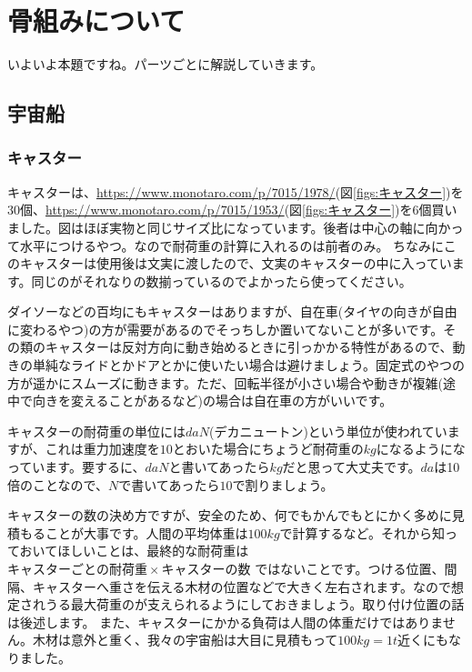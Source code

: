 \documentclass[uplatex,dvipdfmx]{jsarticle}
\begin{document}
\section{骨組みについて}

いよいよ本題ですね。パーツごとに解説していきます。

\subsection{宇宙船}
\subsubsection{キャスター}

キャスターは、\url{https://www.monotaro.com/p/7015/1978/}(図\ref{figs:キャスター})を30個、\url{https://www.monotaro.com/p/7015/1953/}(図\ref{figs:キャスター})を6個買いました。図はほぼ実物と同じサイズ比になっています。後者は中心の軸に向かって水平につけるやつ。なので耐荷重の計算に入れるのは前者のみ。
ちなみにこのキャスターは使用後は文実に渡したので、文実のキャスターの中に入っています。同じのがそれなりの数揃っているのでよかったら使ってください。

ダイソーなどの百均にもキャスターはありますが、自在車(タイヤの向きが自由に変わるやつ)の方が需要があるのでそっちしか置いてないことが多いです。その類のキャスターは反対方向に動き始めるときに引っかかる特性があるので、動きの単純なライドとかドアとかに使いたい場合は避けましょう。固定式のやつの方が遥かにスムーズに動きます。ただ、回転半径が小さい場合や動きが複雑(途中で向きを変えることがあるなど)の場合は自在車の方がいいです。

キャスターの耐荷重の単位には$\si{daN}$(デカニュートン)という単位が使われていますが、これは重力加速度を$10$とおいた場合にちょうど耐荷重の$\si{kg}$になるようになっています。要するに、$\si{daN}$と書いてあったら$\si{kg}$だと思って大丈夫です。$\si{da}$は10倍のことなので、$\si{N}$で書いてあったら$10$で割りましょう。

キャスターの数の決め方ですが、安全のため、何でもかんでもとにかく多めに見積もることが大事です。人間の平均体重は$100\si{kg}$で計算するなど。それから知っておいてほしいことは、最終的な耐荷重は $キャスターごとの耐荷重\times{}キャスターの数$ ではないことです。つける位置、間隔、キャスターへ重さを伝える木材の位置などで大きく左右されます。なので想定されうる最大荷重のが支えられるようにしておきましょう。取り付け位置の話は後述します。
また、キャスターにかかる負荷は人間の体重だけではありません。木材は意外と重く、我々の宇宙船は大目に見積もって$100\si{kg} = 1\si{t}$近くにもなりました。
\end{document}
